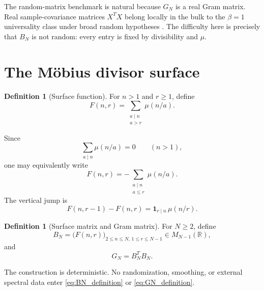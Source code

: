 \documentclass[11pt]{amsart}
\numberwithin{equation}{section}
\theoremstyle{plain}
\theoremstyle{definition}
\newtheorem{definition}[theorem]{Definition}
\theoremstyle{remark}
\newcommand{\mob}{\mu}
\begin{document}
The random-matrix benchmark is natural because $G_N$ is a real Gram matrix.  Real sample-covariance matrices $X^TX$ belong locally in the bulk to the $\beta=1$ universality class under broad random hypotheses \cite{TaoVu2012,PillaiYin2014}.  The difficulty here is precisely that $B_N$ is not random: every entry is fixed by divisibility and $\mob$.

\section{The M\"obius divisor surface}
\label{sec:mobius_surface}

\begin{definition}[Surface function]
\label{def:surface_function}
For $n>1$ and $r\ge1$, define
\begin{equation}
F(n,r)=\sum_{\substack{a\mid n\\a>r}}\mob(n/a).
\label{eq:surface_definition}
\end{equation}
\end{definition}

Since
\begin{equation}
\sum_{a\mid n}\mob(n/a)=0
\qquad(n>1),
\label{eq:mobius_divisor_zero}
\end{equation}
one may equivalently write
\begin{equation}
F(n,r)=-\sum_{\substack{a\mid n\\a\le r}}\mob(n/a).
\label{eq:surface_prefix_form}
\end{equation}
The vertical jump is
\begin{equation}
F(n,r-1)-F(n,r)=\mathbf 1_{r\mid n}\,\mob(n/r).
\label{eq:vertical_jump}
\end{equation}

\begin{definition}[Surface matrix and Gram matrix]
\label{def:surface_gram}
For $N\ge2$, define
\begin{equation}
B_N=\bigl(F(n,r)\bigr)_{2\le n\le N,\,1\le r\le N-1}
\in M_{N-1}(\mathbb R),
\label{eq:BN_definition}
\end{equation}
and
\begin{equation}
G_N=B_N^TB_N.
\label{eq:GN_definition}
\end{equation}
\end{definition}

The construction is deterministic.  No randomization, smoothing, or external spectral data enter \eqref{eq:BN_definition} or \eqref{eq:GN_definition}.
\end{document}
